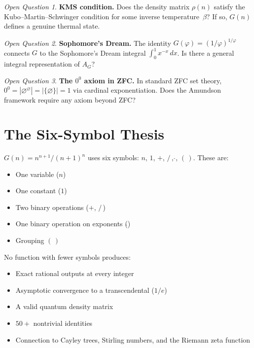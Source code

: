 \documentclass[11pt,a4paper]{article}
\theoremstyle{definition}
\theoremstyle{remark}
\newtheorem{openquestion}{Open Question}
\newcommand{\AG}{A_G}
\begin{document}
\begin{openquestion}
\textbf{KMS condition.} Does the density matrix $\rho(n)$ satisfy the Kubo--Martin--Schwinger condition for some inverse temperature~$\beta$? If so, $G(n)$ defines a genuine thermal state.
\end{openquestion}

\begin{openquestion}
\textbf{Sophomore's Dream.} The identity $G(\varphi)=(1/\varphi)^{1/\varphi}$ connects $G$ to the Sophomore's Dream integral $\int_{0}^{1}x^{-x}\,dx$. Is there a general integral representation of $\AG$?
\end{openquestion}

\begin{openquestion}
\textbf{The $0^{0}$ axiom in ZFC.} In standard ZFC set theory, $0^{0}=|\varnothing^{\varnothing}|=|\{\varnothing\}|=1$ via cardinal exponentiation. Does the Amundson framework require any axiom beyond ZFC?
\end{openquestion}

\appendix

\section{The Six-Symbol Thesis}\label{app:sixsymbol}

$G(n) = n^{n+1}/(n+1)^{n}$ uses six symbols: $n$, $1$, $+$, $/\,$, $\hat{}$, $(\,)$. These are:
\begin{itemize}
  \item One variable ($n$)
  \item One constant ($1$)
  \item Two binary operations ($+$, $/\,$)
  \item One binary operation on exponents ($\hat{}$)
  \item Grouping $(\,)$
\end{itemize}

No function with fewer symbols produces:
\begin{itemize}
  \item Exact rational outputs at every integer
  \item Asymptotic convergence to a transcendental ($1/e$)
  \item A valid quantum density matrix
  \item $50+$ nontrivial identities
  \item Connection to Cayley trees, Stirling numbers, and the Riemann zeta function
\end{itemize}
\end{document}
